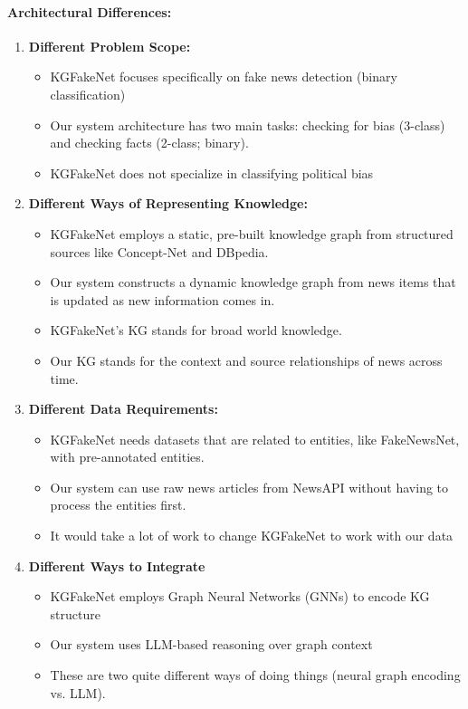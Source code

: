 \documentclass[11pt]{article}
\begin{document}
\paragraph{Architectural Differences:}
\begin{enumerate}
    \item \textbf{Different Problem Scope:}
    \begin{itemize}
        \item KGFakeNet focuses specifically on fake news detection (binary classification)
        \item Our system architecture has two main tasks: checking for bias (3-class) and checking facts (2-class; binary).
        \item KGFakeNet does not specialize in classifying political bias

    \end{itemize}
    
    \item \textbf{Different Ways of Representing Knowledge:}
    \begin{itemize}
        \item KGFakeNet employs a static, pre-built knowledge graph from structured sources like Concept-Net and DBpedia.
        \item Our system constructs a dynamic knowledge graph from news items that is updated as new information comes in.
        \item KGFakeNet's KG stands for broad world knowledge.
        \item Our KG stands for the context and source relationships of news across time.

    \end{itemize}
    
    \item \textbf{Different Data Requirements:}
    \begin{itemize}
        \item KGFakeNet needs datasets that are related to entities, like FakeNewsNet, with pre-annotated entities.
        \item Our system can use raw news articles from NewsAPI without having to process the entities first.
        \item It would take a lot of work to change KGFakeNet to work with our data
    \end{itemize}
    
    \item \textbf{Different Ways to Integrate}
    \begin{itemize}
        \item KGFakeNet employs Graph Neural Networks (GNNs) to encode KG structure 
        \item Our system uses LLM-based reasoning over graph context
        \item  These are two quite different ways of doing things (neural graph encoding vs. LLM).


\end{itemize}
\end{enumerate}
\end{document}
